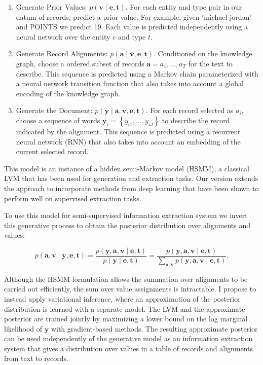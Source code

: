 \documentclass[12pt]{article}
\newcommand\set[1]{\left\{#1\right\}}
\newcommand{\ba}{\mathbf{a}}
\newcommand{\be}{\mathbf{e}}
\newcommand{\bt}{\mathbf{t}}
\newcommand{\bv}{\mathbf{v}}
\newcommand{\by}{\mathbf{y}}
\begin{document}
\begin{enumerate}
\item Generate Prior Values: $p(\bv\mid\be,\bt)$.
For each entity and type pair in our datum of records, predict a prior value.
For example, given `michael jordan' and POINTS we predict 19.
Each value is predicted independently using a neural network over the entity $e$ and type $t$. 
\item Generate Record Alignments: $p(\ba \mid\bv,\be,\bt)$.
Conditioned on the knowledge graph, choose a ordered subset of records $\ba =a_1,\ldots,a_T$ for the text to describe. 
This sequence is predicted using a Markov chain parameterized with a neural network transition function that also takes into account a global encoding of the knowledge graph. 
\item Generate the Document: $p(\by\mid\ba,\bv,\be,\bt)$.
For each record selected as $a_i$, choose a sequence of words $\by_i = \set{y_{i1},\ldots,y_{iJ}}$ to describe the record
indicated by the alignment. This sequence is predicted using 
a recurrent neural network (RNN) that also takes into account 
an embedding of the current selected record. 
\end{enumerate}
This model is an instance of a hidden semi-Markov model (HSMM), a classical LVM that has been used for generation and extraction tasks. Our version extends the approach to incorporate methods from deep learning that have been shown to perform well on supervised extraction tasks.

To use this model for semi-supervised information extraction system we invert this generative process
to obtain the posterior distribution over alignments and values:
\begin{linenomath*}
$$
p(\ba,\bv\mid\by,\be,\bt)=\frac{p(\by,\ba,\bv\mid\be,\bt)}{p(\by\mid\be,\bt)}
=\frac{p(\by,\ba,\bv\mid\be,\bt)}{\sum_{\ba,\bv} p(\by,\ba,\bv\mid\be,\bt)}.
$$
\end{linenomath*}
Although the HSMM formulation allows the summation over alignments to be carried out efficiently,
the sum over value assignments is intractable.
I propose to instead apply variational inference,
where an approximation of the posterior distribution
is learned with a separate model.
The LVM and the approximate posterior are trained jointly 
by maximizing a lower bound on the log marginal likelihood of $\by$ with gradient-based methods.
The resulting approximate posterior  can be used independently of the 
generative model as an information extraction system that gives a distribution over
values in a table of records and alignments from text to records.
\end{document}
